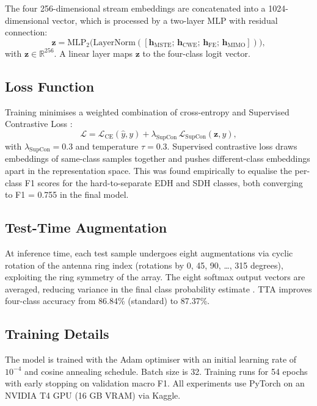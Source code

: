 \documentclass[journal]{IEEEtran}
\begin{document}
The four 256-dimensional stream embeddings are concatenated
into a 1024-dimensional vector, which is processed by a
two-layer MLP with residual connection:
\begin{equation}
  \mathbf{z} = \text{MLP}_2\bigl(\text{LayerNorm}(
    [\mathbf{h}_\text{MSTE};\,
     \mathbf{h}_\text{CWE};\,
     \mathbf{h}_\text{FE};\,
     \mathbf{h}_\text{MIMO}])\bigr),
  \label{eq:fusion}
\end{equation}
with $\mathbf{z} \in \mathbb{R}^{256}$.  A linear layer maps
$\mathbf{z}$ to the four-class logit vector.

\subsection{Loss Function}

Training minimises a weighted combination of cross-entropy
and Supervised Contrastive Loss \cite{Khosla2020}:
\begin{equation}
  \mathcal{L} = \mathcal{L}_\text{CE}(\hat{y}, y)
    + \lambda_\text{SupCon}\,
    \mathcal{L}_\text{SupCon}(\mathbf{z}, y),
  \label{eq:loss}
\end{equation}
with $\lambda_\text{SupCon} = 0.3$ and temperature
$\tau = 0.3$.  Supervised contrastive loss draws embeddings
of same-class samples together and pushes different-class
embeddings apart in the representation space.  This was found
empirically to equalise the per-class F1 scores for the
hard-to-separate EDH and SDH classes, both converging to
F1 = 0.755 in the final model.

\subsection{Test-Time Augmentation}

At inference time, each test sample undergoes eight
augmentations via cyclic rotation of the antenna ring index
(rotations by 0, 45, 90, \ldots, 315 degrees), exploiting
the ring symmetry of the array.  The eight softmax output
vectors are averaged, reducing variance in the final class
probability estimate \cite{Shanmugam2021}.  TTA improves
four-class accuracy from 86.84\% (standard) to 87.37\%.

\subsection{Training Details}

The model is trained with the Adam optimiser \cite{Kingma2015}
with an initial learning rate of $10^{-4}$ and cosine
annealing schedule.  Batch size is 32.  Training runs for
54 epochs with early stopping on validation macro F1.
All experiments use PyTorch \cite{Paszke2019} on an NVIDIA
T4 GPU (16 GB VRAM) via Kaggle.
\end{document}

